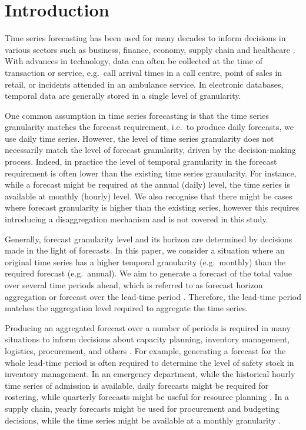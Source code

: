\documentclass[preprint, 3p,
authoryear]{elsarticle} %
\begin{document}
\hypertarget{introduction}{%
\section{Introduction}\label{introduction}}

Time series forecasting has been used for many decades to inform
decisions in various sectors such as business, finance, economy, supply
chain and healthcare \citep{petropoulos2022forecasting}. With advances
in technology, data can often be collected at the time of transaction or
service, e.g.~call arrival times in a call centre, point of sales in
retail, or incidents attended in an ambulance service. In electronic
databases, temporal data are generally stored in a single level of
granularity.

One common assumption in time series forecasting is that the time series
granularity matches the forecast requirement, i.e.~to produce daily
forecasts, we use daily time series. However, the level of time series
granularity does not necessarily match the level of forecast
granularity, driven by the decision-making process. Indeed, in practice
the level of temporal granularity in the forecast requirement is often
lower than the existing time series granularity. For instance, while a
forecast might be required at the annual (daily) level, the time series
is available at monthly (hourly) level. We also recognise that there
might be cases where forecast granularity is higher than the existing
series, however this requires introducing a disaggregation mechanism and
is not covered in this study.

Generally, forecast granularity level and its horizon are determined by
decisions made in the light of forecasts. In this paper, we consider a
situation where an original time series has a higher temporal
granularity (e.g.~monthly) than the required forecast (e.g.~annual). We
aim to generate a forecast of the total value over several time periods
ahead, which is referred to as forecast horizon aggregation or forecast
over the lead-time period \citep{mohammadipour2012forecast}. Therefore,
the lead-time period matches the aggregation level required to aggregate
the time series.

Producing an aggregated forecast over a number of periods is required in
many situations to inform decisions about capacity planning, inventory
management, logistics, procurement, and others
\citep{nikolopoulos2011aggregate, zotteri2007model}. For example,
generating a forecast for the whole lead-time period is often required
to determine the level of safety stock in inventory management. In an
emergency department, while the historical hourly time series of
admission is available, daily forecasts might be required for rostering,
while quarterly forecasts might be useful for resource planning
\citep{rostami2020anticipating}. In a supply chain, yearly forecasts
might be used for procurement and budgeting decisions, while the time
series might be available at a monthly granularity
\citep{mircetic2021forecasting}.
\end{document}
